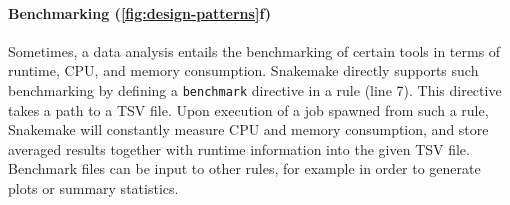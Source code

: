 \documentclass{scrartcl}
\begin{document}
\paragraph{Benchmarking (\autoref{fig:design-patterns}f)}
Sometimes, a data analysis entails the benchmarking of certain tools in terms of runtime, CPU, and memory consumption.
Snakemake directly supports such benchmarking by defining a \lstinline!benchmark! directive in a rule (line 7).
This directive takes a path to a TSV file.
Upon execution of a job spawned from such a rule, Snakemake will constantly measure CPU and memory consumption, and store averaged results together with runtime information into the given TSV file.
Benchmark files can be input to other rules, for example in order to generate plots or summary statistics.

\printbibliography
\end{document}

